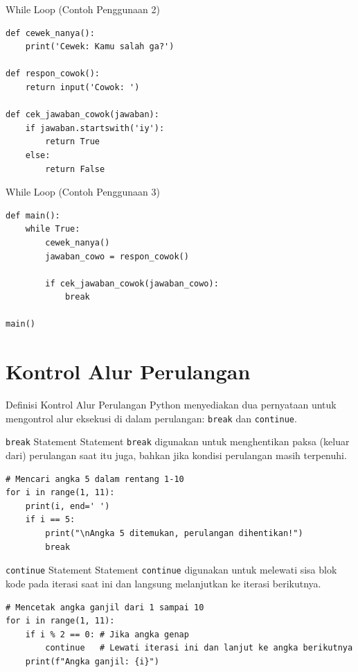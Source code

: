 \documentclass[aspectratio=169, table]{beamer}
\begin{document}
\begin{frame}[fragile]{While Loop (Contoh Penggunaan 2)}
\begin{lstlisting}[style=PythonStyle, caption={Kode Python: cowok_selalu_salah.py}]
def cewek_nanya():
    print('Cewek: Kamu salah ga?')

def respon_cowok():
    return input('Cowok: ')

def cek_jawaban_cowok(jawaban):
    if jawaban.startswith('iy'):
        return True
    else:
        return False
\end{lstlisting}
\end{frame}

\begin{frame}[fragile]{While Loop (Contoh Penggunaan 3)}
\begin{lstlisting}[style=PythonStyle, caption={Kode Python: cowok_selalu_salah.py}]
def main():
    while True:
        cewek_nanya()
        jawaban_cowo = respon_cowok()

        if cek_jawaban_cowok(jawaban_cowo):
            break

main()
\end{lstlisting}
\end{frame}

\section{Kontrol Alur Perulangan}
\begin{frame}[fragile]{Definisi Kontrol Alur Perulangan}
Python menyediakan dua pernyataan untuk mengontrol alur eksekusi di dalam perulangan: \texttt{break} dan \texttt{continue}.
\end{frame}

\begin{frame}[fragile]{\texttt{break} Statement}
Statement \texttt{break} digunakan untuk menghentikan paksa (keluar dari) perulangan saat itu juga, bahkan jika kondisi perulangan masih terpenuhi.

\begin{lstlisting}[style=PythonStyle, caption={Kode Python: break_keyword.py}]
# Mencari angka 5 dalam rentang 1-10
for i in range(1, 11):
    print(i, end=' ')
    if i == 5:
        print("\nAngka 5 ditemukan, perulangan dihentikan!")
        break 
\end{lstlisting}
\end{frame}

\begin{frame}[fragile]{\texttt{continue} Statement}
Statement \texttt{continue} digunakan untuk melewati sisa blok kode pada iterasi saat ini dan langsung melanjutkan ke iterasi berikutnya.

\begin{lstlisting}[style=PythonStyle, caption={Kode Python: continue_keyword.py}]
# Mencetak angka ganjil dari 1 sampai 10
for i in range(1, 11):
    if i % 2 == 0: # Jika angka genap
        continue   # Lewati iterasi ini dan lanjut ke angka berikutnya
    print(f"Angka ganjil: {i}")
\end{lstlisting}
\end{frame}
\end{document}
